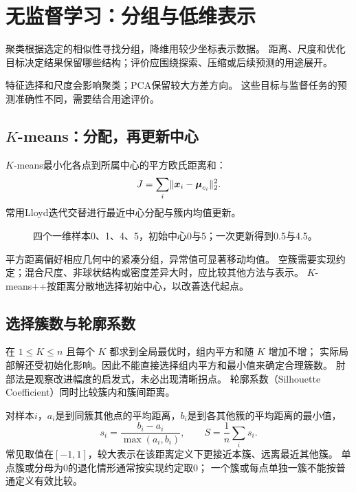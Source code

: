 \chapter{无监督学习：分组与低维表示}
\label{ch:unsupervised}

聚类根据选定的相似性寻找分组，降维用较少坐标表示数据。
距离、尺度和优化目标决定结果保留哪些结构；评价应围绕探索、压缩或后续预测的用途展开。

\begin{keyidea}
特征选择和尺度会影响聚类；PCA保留较大方差方向。
这些目标与监督任务的预测准确性不同，需要结合用途评价。
\end{keyidea}

\section{\texorpdfstring{$K$}{K}-means：分配，再更新中心}
\label{sec:unsup-kmeans}
$K$-means最小化各点到所属中心的平方欧氏距离和：
\[
 J=\sum_i\lVert\boldsymbol{x}_i-\boldsymbol{\mu}_{c_i}\rVert_2^2.
\]
常用Lloyd迭代交替进行最近中心分配与簇内均值更新。

\begin{figure}[htbp]
\centering
\caption{四个一维样本0、1、4、5，初始中心0与5；一次更新得到0.5与4.5。}
\par\smallskip
{}
\end{figure}

平方距离偏好相应几何中的紧凑分组，异常值可显著移动均值。
空簇需要实现约定；混合尺度、非球状结构或密度差异大时，应比较其他方法与表示。
$K$-means++按距离分散地选择初始中心，以改善迭代起点。

\section{选择簇数与轮廓系数}
\label{sec:unsup-silhouette}
在 $1\leq K\leq n$ 且每个 $K$ 都求到全局最优时，组内平方和随 $K$ 增加不增；
实际局部解还受初始化影响。因此不能直接选择组内平方和最小值来确定合理簇数。
肘部法是观察改进幅度的启发式，未必出现清晰拐点。
轮廓系数（Silhouette Coefficient）同时比较簇内和簇间距离。

对样本$i$，$a_i$是到同簇其他点的平均距离，$b_i$是到各其他簇的平均距离的最小值，
\[
 s_i=\frac{b_i-a_i}{\max(a_i,b_i)},\qquad S=\frac1n\sum_i s_i.
\]
常见取值在$[-1,1]$，较大表示在该距离定义下更接近本簇、远离最近其他簇。
单点簇或分母为0的退化情形通常按实现约定取0；
一个簇或每点单独一簇不能按普通定义有效比较。

